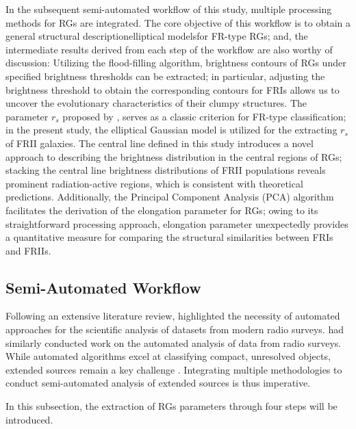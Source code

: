 \documentclass{aa}
\begin{document}
In the subsequent semi-automated workflow of this study, multiple processing methods for RGs are integrated. The core objective of this workflow is to obtain a general structural description\textemdash elliptical models\textemdash for FR-type RGs; and, the intermediate results derived from each step of the workflow are also worthy of discussion: Utilizing the flood-filling algorithm, brightness contours of RGs under specified brightness thresholds can be extracted; in particular, adjusting the brightness threshold to obtain the corresponding contours for FRIs allows us to uncover the evolutionary characteristics of their clumpy structures. The parameter $r_s$ proposed by \cite{lin_populations_2010}, serves as a classic criterion for FR-type classification; in the present study, the elliptical Gaussian model is utilized for the extracting $r_s$ of FRII galaxies. The central line defined in this study introduces a novel approach to describing the brightness distribution in the central regions of RGs; stacking the central line brightness distributions of FRII populations reveals prominent radiation-active regions, which is consistent with theoretical predictions. Additionally, the Principal Component Analysis (PCA) algorithm facilitates the derivation of the elongation parameter for RGs; owing to its straightforward processing approach, elongation parameter unexpectedly provides a quantitative measure for comparing the structural similarities between FRIs and FRIIs.

 


\subsection{Semi-Automated Workflow}\label{sec:Section3_1}

Following an extensive literature review, \cite{mingo_revisiting_2019} highlighted the necessity of automated approaches for the scientific analysis of datasets from modern radio surveys. \cite{gupta_machine_2025} had similarly conducted work on the automated analysis of data from radio surveys. While automated algorithms excel at classifying compact, unresolved objects, extended sources remain a key challenge \citep{boyce_hydra_2023,boyce_hydra_2023-1}. Integrating multiple methodologies to conduct semi-automated analysis of extended sources is thus imperative.

In this subsection, the extraction of RGs parameters through four steps will be introduced.
\end{document}
